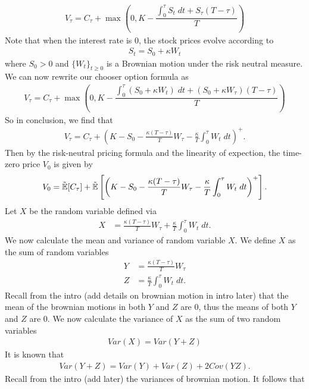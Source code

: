 \documentclass[reqno]{amsart}
\begin{document}
\begin{align}
     V_\tau = C_\tau + \max(0, K - \dfrac{\int_0^\tau S_t \; dt + S_\tau (T - \tau)}{T})
\end{align}
Note that when the interest rate is $0$, the stock prices evolve according to 
\begin{align}
     S_t = S_0 + \kappa W_t
\end{align}
where $S_0 > 0$ and $\{W_t\}_{t \ge 0}$ is a Brownian motion under the risk neutral measure. We can now rewrite our chooser option formula as
\begin{align}
     V_\tau = C_\tau + \max(0, K - \dfrac{\int_0^\tau \left( S_0 + \kappa W_t \right) \; dt + (S_0 + \kappa W_\tau) (T - \tau)}{T})
\end{align}
So in conclusion, we find that 
\begin{align}
     V_\tau = C_\tau + \left(K- S_0 - \frac{\kappa(T-\tau)}{T} W_\tau - \frac{\kappa}{T} \int_0^\tau W_t \; dt  \right)^+.
\end{align}
Then by the risk-neutral pricing formula and the linearity of expection, the time-zero price $V_0$ is given by
\begin{align} \label{eq: expect form}
     V_0 = \tilde{\mathbb{E}}[C_\tau] + \tilde{\mathbb{E}}\left[\left(K- S_0 - \frac{\kappa(T-\tau)}{T} W_\tau - \frac{\kappa}{T} \int_0^\tau W_t \; dt  \right)^+\right].
\end{align}
Let $X$ be the random variable defined via 
\begin{align}
     X &= \frac{\kappa(T-\tau)}{T} W_\tau + \frac{\kappa}{T} \int_0^\tau W_t \; dt.
\end{align}
We now calculate the mean and variance of random variable $X$. We define $X$ as the sum of random variables
\begin{align}
     Y &= \frac{\kappa(T-\tau)}{T} W_\tau\\
     Z &= \frac{\kappa}{T} \int_0^\tau W_t \; dt.
\end{align}
Recall from the intro (add details on brownian motion in intro later) that the mean of the brownian motions in both $Y$ and $Z$ are $0$, thus the means of both $Y$ and $Z$ are 0. 
We now calculate the variance of $X$ as the sum of two random variables
\begin{align}
     Var(X) = Var(Y + Z)
\end{align}
It is known that
\begin{align}
     Var(Y + Z) = Var(Y) + Var(Z) + 2Cov(YZ).
\end{align}
Recall from the intro (add later) the variances of brownian motion. It follows that 
\end{document}
